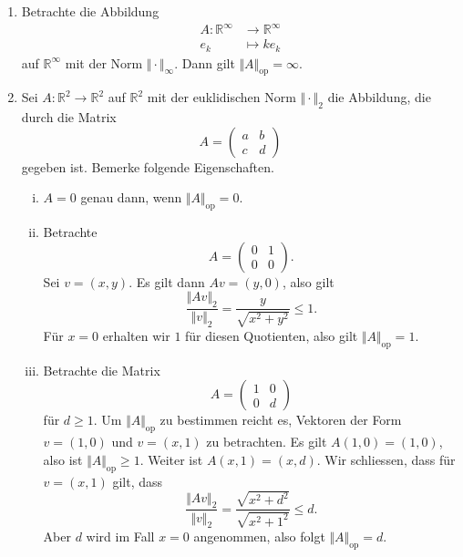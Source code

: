 \documentclass[../main.tex]{subfiles}
\begin{document}
\begin{examples}
  \leavevmode
  \begin{enumerate}[(1)]
    \item Betrachte die Abbildung
      \begin{align*}
        A \colon \mathbb{R}^{\infty} & \to \mathbb{R}^{\infty} \\
        e_k & \mapsto ke_k
      \end{align*}
      auf $\mathbb{R}^{\infty}$ mit der Norm $\Vert \cdot \Vert_{\infty}$.
      Dann gilt $\Vert A \Vert_{\text{op}} = \infty$.
    \item Sei $A \colon \mathbb{R}^2 \to \mathbb{R}^2$ 
      auf $\mathbb{R}^{2}$ mit der euklidischen Norm
      $\Vert \cdot \Vert_2$ die Abbildung, die durch
      die Matrix
      \[
        A =
        \begin{pmatrix}
          a & b \\ c & d
        \end{pmatrix}
      \]
      gegeben ist.
      Bemerke folgende Eigenschaften.
      \begin{enumerate}[(i)]
        \item $A = 0$ genau dann, wenn $\Vert A \Vert_\text{op} = 0$.
        \item Betrachte
          \[
            A =
            \begin{pmatrix}
              0 & 1 \\ 0 & 0
            \end{pmatrix}.
          \]
          Sei $v = (x, y)$.
          Es gilt dann $Av = (y, 0)$, also gilt
          \[
            \frac{\Vert Av \Vert_2}{\Vert v \Vert_2} = \frac{y}{\sqrt{x^2 + y^2} } \leq 1.
          \]
          Für $x = 0$ erhalten wir $1$ für diesen Quotienten,
          also gilt $\Vert A \Vert_{\text{op}} = 1$.
        \item Betrachte die Matrix
          \[
            A =
            \begin{pmatrix}
              1 & 0 \\ 0 & d
            \end{pmatrix}
          \]
          für $d \geq 1$.
          Um $\Vert A \Vert_{\text{op}}$ zu bestimmen
          reicht es, Vektoren der Form $v = (1, 0)$ 
          und $v = (x, 1)$ zu betrachten.
          Es gilt $A(1, 0) = (1, 0)$,
          also ist $\Vert A \Vert_{\text{op}} \geq 1$. 
          Weiter ist
          $A(x, 1) = (x, d)$.
          Wir schliessen, dass für $v = (x, 1)$ gilt, dass
          \[
            \frac{\Vert Av \Vert_2}{\Vert v \Vert_2}
            = \frac{\sqrt{x^2 + d^2}}{\sqrt{x^2 + 1^2}} \leq d.
          \]
          Aber $d$ wird im Fall $x = 0$ angenommen,
          also folgt $\Vert A \Vert_{\text{op}} = d$.
      \end{enumerate}
  \end{enumerate}
\end{examples}
\end{document}

